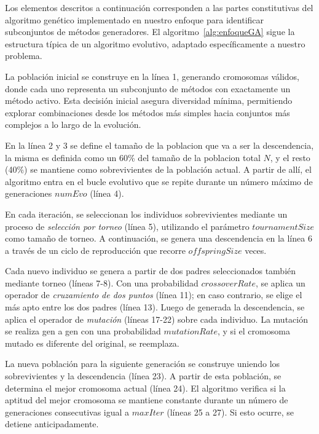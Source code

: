 
Los elementos descritos a continuación corresponden a las partes constitutivas del algoritmo genético implementado en nuestro enfoque 
para identificar subconjuntos de métodos generadores. 
El algoritmo~\ref{alg:enfoqueGA} sigue la estructura típica de un algoritmo evolutivo, adaptado específicamente a nuestro problema.

La población inicial se construye en la línea 1, generando cromosomas válidos, donde cada uno representa un subconjunto de métodos con exactamente un método activo.
Esta decisión inicial asegura diversidad mínima, permitiendo explorar combinaciones desde los métodos más simples hacia conjuntos más complejos 
a lo largo de la evolución.

En la línea 2 y 3 se define el tamaño de la poblacion que va a ser la descendencia, la misma es definida como un 60\% del tamaño de la poblacion total $N$, 
y el resto (40\%) se mantiene como sobrevivientes de la población actual. A partir de allí, el algoritmo entra en el bucle evolutivo que se repite durante un número máximo de generaciones $numEvo$ (línea 4).


En cada iteración, se seleccionan los individuos sobrevivientes mediante un proceso de \textit{selección por torneo} (línea 5), utilizando el parámetro $tournamentSize$ como tamaño de torneo.
A continuación, se genera una descendencia en la línea 6 a través de un ciclo de reproducción que recorre $offspringSize$ veces.

Cada nuevo individuo se genera a partir de dos padres seleccionados también mediante torneo (líneas 7-8). 
Con una probabilidad $crossoverRate$, se aplica un operador de \textit{cruzamiento de dos puntos} (línea 11); en caso contrario, se elige el más apto entre los dos padres (línea 13).
Luego de generada la descendencia, se aplica el operador de \textit{mutación} (líneas 17-22) sobre cada individuo. 
La mutación se realiza gen a gen con una probabilidad $mutationRate$, y si el cromosoma mutado es diferente del original, se reemplaza.

La nueva población para la siguiente generación se construye uniendo los sobrevivientes y la descendencia (línea 23). A partir de esta población, se determina el mejor cromosoma actual (línea 24).
El algoritmo verifica si la aptitud del mejor cromosoma se mantiene constante durante un número de generaciones consecutivas igual a $maxIter$ (líneas 25 a 27). Si esto ocurre, se detiene anticipadamente.

